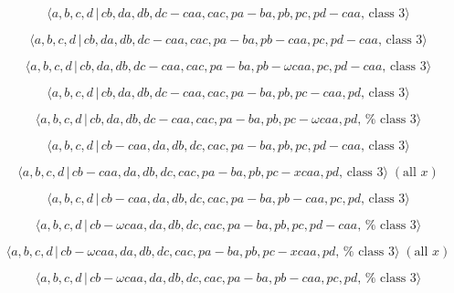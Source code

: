 \documentclass[10pt]{article}
\begin{document}
\begin{equation}
\langle a,b,c,d\,|\,cb,da,db,dc-caa,cac,pa-ba,pb,pc,pd-caa,\,\text{class }%
3\rangle  \tag{7.3858}
\end{equation}

\begin{equation}
\langle a,b,c,d\,|\,cb,da,db,dc-caa,cac,pa-ba,pb-caa,pc,pd-caa,\,\text{class 
}3\rangle  \tag{7.3859}
\end{equation}

\begin{equation}
\langle a,b,c,d\,|\,cb,da,db,dc-caa,cac,pa-ba,pb-\omega caa,pc,pd-caa,\,%
\text{class }3\rangle  \tag{7.3860}
\end{equation}

\begin{equation}
\langle a,b,c,d\,|\,cb,da,db,dc-caa,cac,pa-ba,pb,pc-caa,pd,\,\text{class }%
3\rangle  \tag{7.3861}
\end{equation}

\begin{equation}
\langle a,b,c,d\,|\,cb,da,db,dc-caa,cac,pa-ba,pb,pc-\omega caa,pd,\,\text{%
class }3\rangle  \tag{7.3862}
\end{equation}

\begin{equation}
\langle a,b,c,d\,|\,cb-caa,da,db,dc,cac,pa-ba,pb,pc,pd-caa,\,\text{class }%
3\rangle  \tag{7.3863}
\end{equation}

\begin{equation}
\langle a,b,c,d\,|\,cb-caa,da,db,dc,cac,pa-ba,pb,pc-xcaa,pd,\,\text{class }%
3\rangle \;(\text{all }x)  \tag{7.3864}
\end{equation}

\begin{equation}
\langle a,b,c,d\,|\,cb-caa,da,db,dc,cac,pa-ba,pb-caa,pc,pd,\,\text{class }%
3\rangle  \tag{7.3865}
\end{equation}

\begin{equation}
\langle a,b,c,d\,|\,cb-\omega caa,da,db,dc,cac,pa-ba,pb,pc,pd-caa,\,\text{%
class }3\rangle  \tag{7.3866}
\end{equation}

\begin{equation}
\langle a,b,c,d\,|\,cb-\omega caa,da,db,dc,cac,pa-ba,pb,pc-xcaa,pd,\,\text{%
class }3\rangle \;(\text{all }x)  \tag{7.3867}
\end{equation}

\begin{equation}
\langle a,b,c,d\,|\,cb-\omega caa,da,db,dc,cac,pa-ba,pb-caa,pc,pd,\,\text{%
class }3\rangle  \tag{7.3868}
\end{equation}
\end{document}
